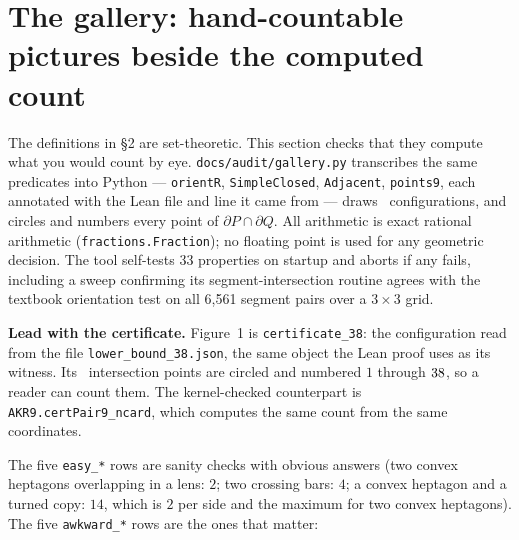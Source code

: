 \documentclass[11pt]{article}
\newcommand{\code}[1]{\texttt{\small #1}}
\begin{document}
\section{The gallery: hand-countable pictures beside the computed count}

The definitions in \S2 are set-theoretic. This section checks that they compute
what you would count by eye. \code{docs/audit/gallery.py} transcribes the same
predicates into Python --- \code{orientR}, \code{SimpleClosed},
\code{Adjacent}, \code{points9}, each annotated with the Lean file and line it
came from --- draws \galcount\ configurations, and circles and numbers every
point of $\partial P\cap\partial Q$. All arithmetic is exact rational
arithmetic (\code{fractions.Fraction}); no floating point is used for any
geometric decision. The tool self-tests 33 properties on startup and aborts if
any fails, including a sweep confirming its segment-intersection routine agrees
with the textbook orientation test on all 6{,}561 segment pairs over a
$3\times3$ grid.

\medskip
\noindent\textbf{Lead with the certificate.} Figure~1 is
\code{certificate\_38}: the configuration read from the file
\code{lower\_bound\_38.json}, the same object the Lean proof
uses as its witness. Its \certcount\ intersection points are circled and
numbered $1$ through $38$, so a reader can count them. The
kernel-checked counterpart is \code{AKR9.certPair9\_ncard}, which computes the
same count from the same coordinates.



\medskip
\noindent The five \code{easy\_*} rows are sanity checks with obvious answers
(two convex heptagons overlapping in a lens: $2$; two crossing bars: $4$; a
convex heptagon and a turned copy: $14$, which is $2$ per side and the maximum
for two convex heptagons). The five \code{awkward\_*} rows are the ones that
matter:
\end{document}
